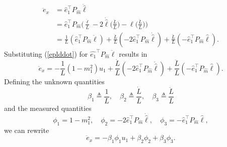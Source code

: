 \begin{align}
\ddot{e}_x&=\hat{e}_1^{\top}P_{\hat{m}}\ddot{\hat{\ell}}
\\&=\hat{e}_1^{\top}P_{\hat{m}}\bigg(\frac{\ddot{\ell}}{L}-2\dot{\hat{\ell}}\bigg(\frac{\dot{L}}{L}\bigg)-\hat{\ell}\bigg(\frac{\ddot{L}}{L}\bigg)\bigg)
\\&=\frac{1}{L}(\hat{e}_1^{\top}P_{\hat{m}}\ddot{\ell})+\frac{\dot{L}}{L}(-2\hat{e}_1^{\top}P_{\hat{m}}\dot{\hat{\ell}})+\frac{\ddot{L}}{L}(-\hat{e}_1^{\top}P_{\hat{m}}\hat{\ell}).
\end{align}
Substituting (\ref{eplddot}) for $\hat{e_1}^{\top}P_{\hat{m}}\ddot{\ell}$ results in  
\begin{equation}
\ddot{e}_x=-\frac{1}{L}(1-m_1^2)u_1+\frac{\dot{L}}{L}(-2\hat{e}_1^{\top}P_{\hat{m}}\dot{\hat{\ell}})+\frac{\ddot{L}}{L}(-\hat{e}_1^{\top}P_{\hat{m}}\hat{\ell}).
\end{equation} 
Defining the unknown quantities
\begin{equation}
\beta_1\triangleq\frac{1}{L},\quad \beta_2\triangleq\frac{\dot{L}}{L}, \quad \beta_3\triangleq\frac{\ddot{L}}{L}
\end{equation}
and the measured quantities
\begin{equation}
\phi_1=1-m_1^2,\quad \phi_2=-2\hat{e}_1^{\top}P_{\hat{m}}\dot{\hat{\ell}}, \quad \phi_3=-\hat{e}_1^{\top}P_{\hat{m}}\hat{\ell},
\end{equation}
we can rewrite 
\begin{equation}
\ddot{e}_x=-\beta_1\phi_1u_1+\beta_2\phi_2+\beta_3\phi_3.
\label{exddot}
\end{equation}

